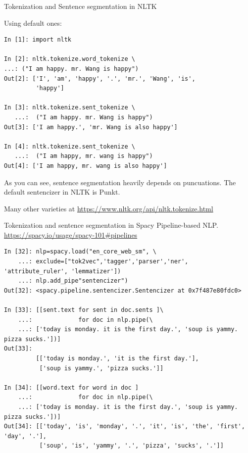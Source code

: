 \documentclass[11pt]{beamer}
\begin{document}
\begin{frame}{Tokenization and Sentence segmentation in NLTK}

  Using default ones: 

 \begin{verbatim}
In [1]: import nltk 

In [2]: nltk.tokenize.word_tokenize \ 
...: ("I am happy. mr. Wang is happy")
Out[2]: ['I', 'am', 'happy', '.', 'mr.', 'Wang', 'is', 
         'happy']

In [3]: nltk.tokenize.sent_tokenize \
   ...:  ("I am happy. mr. Wang is happy")
Out[3]: ['I am happy.', 'mr. Wang is also happy']

In [4]: nltk.tokenize.sent_tokenize \
   ...:  ("I am happy, mr. wang is happy")
Out[4]: ['I am happy, mr. wang is also happy']
 \end{verbatim}

As you can see, sentence segmentation heavily depends on puncuations. The default sentencizer in NLTK is Punkt. 

Many other varieties at \url{https://www.nltk.org/api/nltk.tokenize.html}
\end{frame}

\begin{frame}[fragile]{Tokenization and sentence segmentation in Spacy}
Pipeline-based NLP. \url{https://spacy.io/usage/spacy-101#pipelines}

  \tiny
  \begin{verbatim}
In [32]: nlp=spacy.load("en_core_web_sm", \
    ...: exclude=["tok2vec",'tagger','parser','ner', 'attribute_ruler', 'lemmatizer'])
    ...: nlp.add_pipe"sentencizer")        
Out[32]: <spacy.pipeline.sentencizer.Sentencizer at 0x7f487e80fdc0>

In [33]: [[sent.text for sent in doc.sents ]\
    ...:             for doc in nlp.pipe(\ 
    ...: ['today is monday. it is the first day.', 'soup is yammy. pizza sucks.'])]
Out[33]:
         [['today is monday.', 'it is the first day.'], 
          ['soup is yammy.', 'pizza sucks.']]

In [34]: [[word.text for word in doc ]
    ...:             for doc in nlp.pipe(\ 
    ...: ['today is monday. it is the first day.', 'soup is yammy. pizza sucks.'])]
Out[34]: [['today', 'is', 'monday', '.', 'it', 'is', 'the', 'first', 'day', '.'], 
          ['soup', 'is', 'yammy', '.', 'pizza', 'sucks', '.']]
  \end{verbatim} 
\end{frame}
\end{document}
